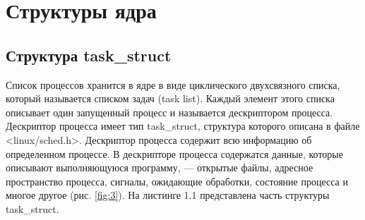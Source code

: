 \section{Структуры ядра}

\subsection{Структура task\_struct}

Список процессов хранится в ядре в виде циклического двухсвязного списка, 
который называется списком задач (task list). 
Каждый элемент этого списка описывает один
запущенный процесс и называется дескриптором процесса. Дескриптор процесса имеет
тип task\_struct, структура которого описана в файле <linux/sched.h>. 
Дескриптор процесса содержит всю информацию об определенном процессе.
В дескрипторе процесса содержатся данные, которые описывают выполняющуюся
программу, — открытые файлы, адресное пространство процесса, сигналы, ожидающие
обработки, состояние процесса и многое другое (рис. \ref{fig:3}). 
На листинге 1.1 представлена часть структуры task\_struct.

\begin{figure}[ht!]
\end{figure}


